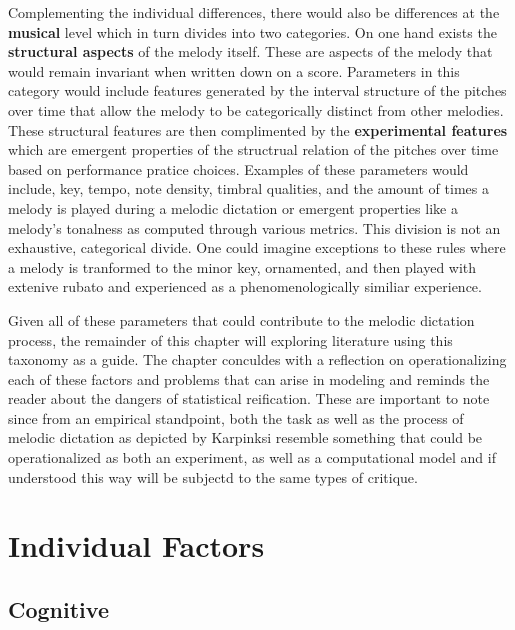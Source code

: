 \documentclass[]{book}
\begin{document}
Complementing the individual differences, there would also be differences at the \textbf{musical} level which in turn divides into two categories.
On one hand exists the \textbf{structural aspects} of the melody itself.
These are aspects of the melody that would remain invariant when written down on a score.
Parameters in this category would include features generated by the interval structure of the pitches over time that allow the melody to be categorically distinct from other melodies.
These structural features are then complimented by the \textbf{experimental features} which are emergent properties of the structrual relation of the pitches over time based on performance pratice choices.
Examples of these parameters would include, key, tempo, note density, timbral qualities, and the amount of times a melody is played during a melodic dictation or emergent properties like a melody's tonalness as computed through various metrics.
This division is not an exhaustive, categorical divide.
One could imagine exceptions to these rules where a melody is tranformed to the minor key, ornamented, and then played with extenive rubato and experienced as a phenomenologically similiar experience.

Given all of these parameters that could contribute to the melodic dictation process, the remainder of this chapter will exploring literature using this taxonomy as a guide.
The chapter conculdes with a reflection on operationalizing each of these factors and problems that can arise in modeling and reminds the reader about the dangers of statistical reification.
These are important to note since from an empirical standpoint, both the task as well as the process of melodic dictation as depicted by Karpinksi resemble something that could be operationalized as both an experiment, as well as a computational model and if understood this way will be subjectd to the same types of critique.

\hypertarget{individual-factors}{%
\section{Individual Factors}\label{individual-factors}}

\hypertarget{cognitive}{%
\subsection{Cognitive}\label{cognitive}}
\end{document}
